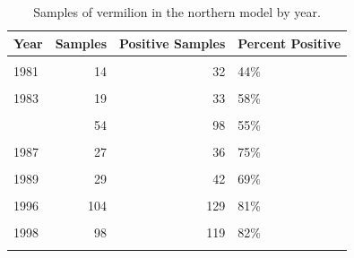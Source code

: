 \documentclass[
  english,
  a4paper,
]{article}
\begin{document}
\begin{table}

\caption{\label{tab:tab-year-mrfss}Samples of vermilion in the northern model by year.}
\centering
\begin{tabular}[t]{lrrl}
\toprule
Year & Samples & Positive Samples & Percent Positive\\
\midrule
\cellcolor{gray!6}{1980} & \cellcolor{gray!6}{31} & \cellcolor{gray!6}{57} & \cellcolor{gray!6}{54\%}\\
1981 & 14 & 32 & 44\%\\
\cellcolor{gray!6}{1982} & \cellcolor{gray!6}{24} & \cellcolor{gray!6}{41} & \cellcolor{gray!6}{59\%}\\
1983 & 19 & 33 & 58\%\\
\cellcolor{gray!6}{1984} & \cellcolor{gray!6}{34} & \cellcolor{gray!6}{59} & \cellcolor{gray!6}{58\%}\\
\addlinespace
1985 & 54 & 98 & 55\%\\
\cellcolor{gray!6}{1986} & \cellcolor{gray!6}{50} & \cellcolor{gray!6}{87} & \cellcolor{gray!6}{57\%}\\
1987 & 27 & 36 & 75\%\\
\cellcolor{gray!6}{1988} & \cellcolor{gray!6}{38} & \cellcolor{gray!6}{48} & \cellcolor{gray!6}{79\%}\\
1989 & 29 & 42 & 69\%\\
\addlinespace
\cellcolor{gray!6}{1995} & \cellcolor{gray!6}{31} & \cellcolor{gray!6}{41} & \cellcolor{gray!6}{76\%}\\
1996 & 104 & 129 & 81\%\\
\cellcolor{gray!6}{1997} & \cellcolor{gray!6}{127} & \cellcolor{gray!6}{162} & \cellcolor{gray!6}{78\%}\\
1998 & 98 & 119 & 82\%\\
\cellcolor{gray!6}{1999} & \cellcolor{gray!6}{82} & \cellcolor{gray!6}{99} & \cellcolor{gray!6}{83\%}\\
\bottomrule
\end{tabular}
\end{table}

\FloatBarrier
\end{document}

